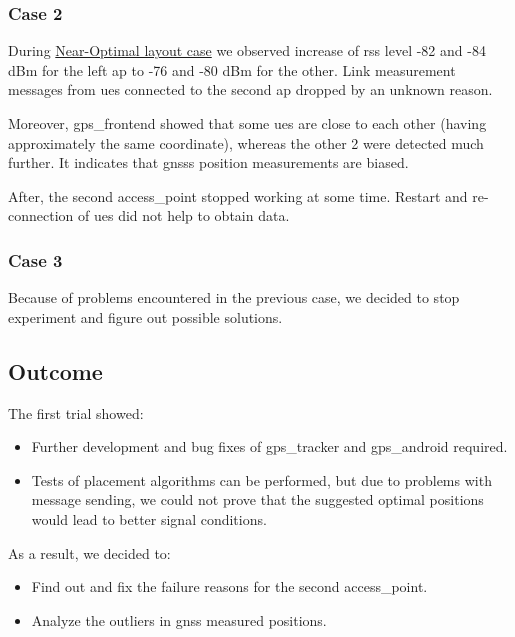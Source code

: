 \subsubsection{Case 2}

During \hyperref[near-optimal-layout]{Near-Optimal layout case} we observed increase of \acrshort{rss} level -82 and -84 dBm for the left \gls{ap} to -76 and -80 dBm for the other. Link measurement messages from \glspl{ue} connected to the second \gls{ap} dropped by an unknown reason.

Moreover, \gls{gps_frontend} showed that some \glspl{ue} are close to each other (having approximately the same coordinate), whereas the other 2 were detected much further. It indicates that \glspl{gnss} position measurements are biased.

After, the second \gls{access_point} stopped working at some time. Restart and re-connection of \glspl{ue} did not help to obtain data.


\subsubsection{Case 3}

Because of problems encountered in the previous case, we decided to stop experiment and figure out possible solutions.

\subsection{Outcome}

The first trial showed:

\begin{itemize}
\tightlist
\item
  Further development and bug fixes of \gls{gps_tracker}  and  \gls{gps_android} required.
\item
  Tests of placement algorithms can be performed, but due to problems with message sending, we could not prove that the suggested optimal positions would lead to better signal conditions.
\end{itemize}

As a result, we decided to:

\begin{itemize}
\tightlist
\item
  Find out and fix the failure reasons for the second \gls{access_point}.
\item
  Analyze the outliers in \gls{gnss} measured positions.
\end{itemize}
